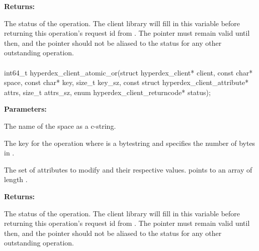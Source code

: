 \noindent\textbf{Returns:}
\begin{description}[labelindent=\widthof{{\code{status}}},leftmargin=*,noitemsep,nolistsep,align=right]
\item[\code{status}] The status of the operation.  The client library will fill in this variable before returning this operation's request id from .  The pointer must remain valid until then, and the pointer should not be aliased to the status for any other outstanding operation.
\end{description}

\paragraph{}
\begin{ccode}
int64_t hyperdex_client_atomic_or(struct hyperdex_client* client,
                const char* space,
                const char* key, size_t key_sz,
                const struct hyperdex_client_attribute* attrs, size_t attrs_sz,
                enum hyperdex_client_returncode* status);
\end{ccode}
\funcdesc 

\noindent\textbf{Parameters:}
\begin{description}[labelindent=\widthof{{\code{attrs}, \code{attrs\_sz}}},leftmargin=*,noitemsep,nolistsep,align=right]
\item[\code{space}] The name of the space as a c-string.
\item[\code{key}, \code{key\_sz}] The key for the operation where  is a bytestring and  specifies the number of bytes in .
\item[\code{attrs}, \code{attrs\_sz}] The set of attributes to modify and their respective values.   points to an array of length .
\end{description}

\noindent\textbf{Returns:}
\begin{description}[labelindent=\widthof{{\code{status}}},leftmargin=*,noitemsep,nolistsep,align=right]
\item[\code{status}] The status of the operation.  The client library will fill in this variable before returning this operation's request id from .  The pointer must remain valid until then, and the pointer should not be aliased to the status for any other outstanding operation.
\end{description}

